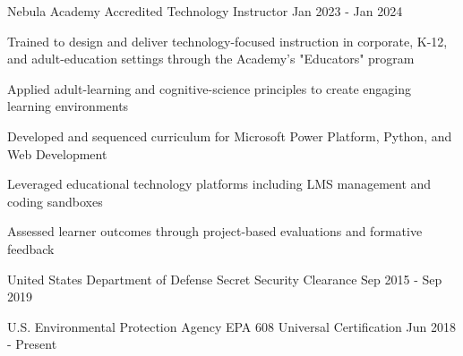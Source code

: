 

\begin{cventries}

  \cventry
  {Nebula Academy} %
    {Accredited Technology Instructor} %
    {} %
    {Jan 2023 - Jan 2024} %
    {
      \begin{cvitems}
        \item {Trained to design and deliver technology-focused instruction in corporate, K-12, and adult-education settings through the Academy's "Educators" program}
        \item {Applied adult-learning and cognitive-science principles to create engaging learning environments}
        \item {Developed and sequenced curriculum for Microsoft Power Platform, Python, and Web Development}
        \item {Leveraged educational technology platforms including LMS management and coding sandboxes}
        \item {Assessed learner outcomes through project-based evaluations and formative feedback}
      \end{cvitems}
    }

  \cventry
  {United States Department of Defense} %
    {Secret Security Clearance} %
    {} %
    {Sep 2015 - Sep 2019} %
    {} %

  \cventry
    {U.S. Environmental Protection Agency} %
    {EPA 608 Universal Certification} %
    {} %
    {Jun 2018 - Present} %
    {} %

\end{cventries}
